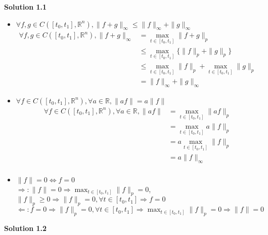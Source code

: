 \documentclass[a4paper,10.5pt]{article}
\newcommand{\R}{\mathbb{R}}
\begin{document}
\clearpage

\noindent \textbf {Solution 1.1} \\
\begin{itemize}
	\item $\forall f, g \in C([t_0, t_1], \R^n), \|f+g\|_\infty \leq \|f\|_\infty + \|g\|_\infty$
	\begin{align*}
		\forall f, g \in C([t_0, t_1], \R^n), \|f+g\|_\infty &= \max_{t \in [t_0, t_1]} \| f + g\|_p \\
		&\leq  \max_{t \in [t_0, t_1]} \{\| f \|_p + \|g\|_p\} \\
		&\leq \max_{t \in [t_0, t_1]} \| f \|_p + \max_{t \in [t_0, t_1]} \|g\|_p \\
		&= \|f\|_\infty + \|g\|_\infty
	\end{align*}
	\item $\forall f \in C([t_0, t_1], \R^n), \forall a \in \R, \|af\| = a\|f\|$
	\begin{align*}
		\forall f \in C([t_0, t_1], \R^n), \forall a \in \R, \|af\| &= \max_{t \in [t_0, t_1]} \| af \|_p \\
		&= \max_{t \in [t_0, t_1]} a \| f \|_p \\
		&= a \max_{t \in [t_0, t_1]} \| f \|_p \\
		&= a\| f \|_\infty \\
	\end{align*}
	\item $\|f\|=0 \Leftrightarrow f = 0$ \\
	$\Rightarrow: \|f\|=0\Rightarrow\max_{t \in [t_0, t_1]} \| f \|_p = 0$, $\|f\|_p \geq 0 \Rightarrow \|f\|_p = 0, \forall t \in [t_0, t_1] \Rightarrow f = 0$ \\
	$\Leftarrow: f = 0 \Rightarrow \|f\|_p = 0, \forall t \in [t_0, t_1] \Rightarrow \max_{t \in [t_0, t_1]} \| f \|_p = 0 \Rightarrow \|f\|=0$ \\
\end{itemize} 

\noindent \textbf {Solution 1.2} \\
\end{document}
